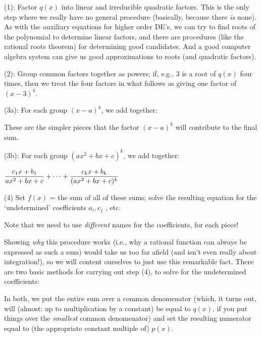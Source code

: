 \msk

(1): Factor $q(x)$ into linear and irreducible quadratic factors. This is the only step where 
we really have no general procedure (basically, because there {\it is} none). As with the 
auxiliary equations for higher order 
DE's, we can try to find roots of the polynomial to determine linear factors, and there
are procedures (like the rational roots theorem) for determining good candidates. And a 
good computer algebra system can give us good approximations to roots (and quadratic factors).

\msk

(2): Group common factors together as powers; if, e.g., 3 is a root of $q(x)$ four times, then
we treat the four factors in what follows as giving one factor of $(x-3)^4$.

\msk

(3a): For each group $(x-a)^k$, we add together:

\ssk


\ssk

These are the simpler pieces that the factor $(x-a)^k$ will contribute to the final sum.

\msk

(3b): For each group $(ax^2+bx+c)^k$, we add together:

\ssk

\hhsk $\displaystyle{{c_1x+b_1}\over{ax^2+bx+c}}+\cdots +{{c_kx+b_k}\over{(ax^2+bx+c)^k}}$

\msk

(4)  Set $f(x)$ = the sum of all of these sums; solve the resulting equation for the `undetermined' coefficients $a_i,c_j$ , etc.

\msk

Note that we need to use {\it different} names for the coefficients, for each piece! 

\msk

Showing {\it why} this procedure works (i.e., why a rational function can always be expressed as such a
sum) would take us too far afield (and isn't even really about integration!), so we will content ourselves 
to just use this remarkable fact. There are two basic methods for carrying out step (4), to solve for the
undetermined coefficients:

\msk

In both, we put the entire sum over a common denomenator (which, it turns out, will 
(almost: up to multiplication by a constant) be equal to $q(x)$, if you put things over 
the {\it smallest} common denomenator) and set the 
resulting numerator equal to (the appropriate constant multiple of) $p(x)$.

